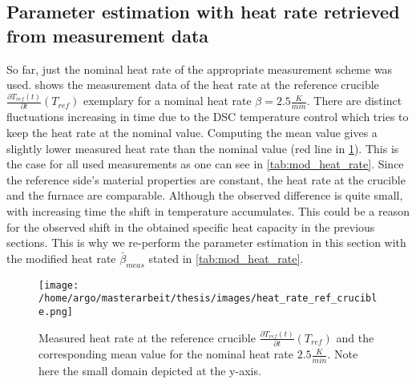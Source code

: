 \documentclass{scrartcl}[12pt, halfparskip]
\numberwithin{equation}{section}
\numberwithin{figure}{section}
\numberwithin{table}{section}
\begin{document}
\subsection{Parameter estimation with heat rate retrieved from measurement data}
\label{sec:param_estimation_mod_heat_rate_FS}
So far, just the nominal heat rate of the appropriate measurement scheme was used. 
 shows the measurement data of the heat rate at the reference crucible $\frac{\partial T_{ref}(t)}{\partial t}(T_{ref})$ exemplary for a nominal heat rate $\beta = 2.5 \frac{K}{min}$. 
There are distinct fluctuations increasing in time due to the DSC temperature control which tries to keep the heat rate at the nominal value. 
Computing the mean value gives a slightly lower measured heat rate than the nominal value (red line in \cref{fig:heat_rate_measurement}). 
This is the case for all used measurements as one can see in \cref{tab:mod_heat_rate}. 
Since the reference side's material properties are constant, the heat rate at the crucible and the furnace are comparable.
Although the observed difference is quite small, with increasing time the shift in temperature accumulates.
This could be a reason for the observed shift in the obtained specific heat capacity in the previous sections.
This is why we re-perform the parameter estimation in this section with the modified heat rate $\bar{\beta}_{meas}$ stated in \cref{tab:mod_heat_rate}.


\begin{figure}[H]
	\centering
	\texttt{[image: /home/argo/masterarbeit/thesis/images/heat\_rate\_ref\_crucible.png]}
	\caption{Measured heat rate at the reference crucible $\frac{\partial T_{ref}(t)}{\partial t}(T_{ref})$ and the corresponding mean value for the nominal heat rate $2.5 \frac{K}{min}$. Note here the small domain depicted at the y-axis.}
	\label{fig:heat_rate_measurement}
\end{figure}
\end{document}
